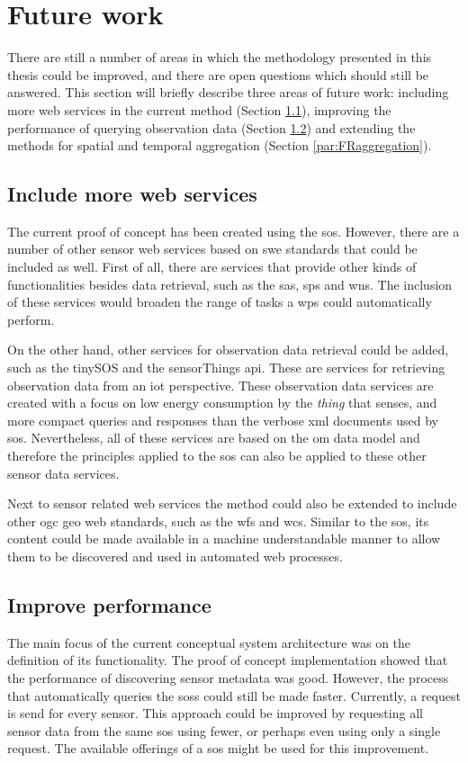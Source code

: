 \section{Future work}
\label{FW}
There are still a number of areas in which the methodology presented in this thesis could be improved, and there are open questions which should still be answered. This section will briefly describe three areas of future work: including more web services in the current method (Section \ref{more}), improving the performance of querying observation data (Section \ref{faster}) and extending the methods for spatial and temporal aggregation (Section \ref{par:FRaggregation}). 

\subsection{Include more web services}
\label{more}
The current proof of concept has been created using the \ac{sos}. However, there are a number of other sensor web services based on \ac{swe} standards that could be included as well. First of all, there are services that provide other kinds of functionalities besides data retrieval, such as the \acf{sas}, \acf{sps} and \acf{wns}. The inclusion of these services would broaden the range of tasks a \ac{wps} could automatically perform. 

On the other hand, other services for observation data retrieval could be added, such as the tinySOS and the sensorThings \ac{api}. These are services for retrieving observation data from an \ac{iot} perspective. These observation data services are created with a focus on low energy consumption by the \textit{thing} that senses, and more compact queries and responses than the verbose \ac{xml} documents used by \ac{sos}. Nevertheless, all of these services are based on the \ac{om} data model and therefore the principles applied to the \ac{sos} can also be applied to these other sensor data services.  

Next to sensor related web services the method could also be extended to include other \ac{ogc} geo web standards, such as the \acf{wfs} and \acf{wcs}. Similar to the \ac{sos}, its content could be made available in a machine understandable manner to allow them to be discovered and used in automated web processes.    

\subsection{Improve performance}
\label{faster}
The main focus of the current conceptual system architecture was on the definition of its functionality. The proof of concept implementation showed that the performance of discovering sensor metadata was good. However, the process that automatically queries the \aclp{sos} could still be made faster. Currently, a request is send for every sensor. This approach could be improved by requesting all sensor data from the same \ac{sos} using fewer, or perhaps even using only a single request. The available offerings of a \ac{sos} might be used for this improvement.      


